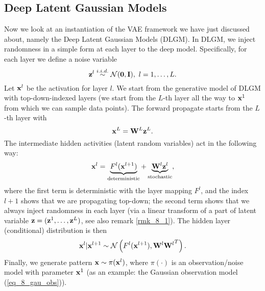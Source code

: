 \documentclass[../book-template.tex]{subfiles}
\begin{document}
\subsection{Deep Latent Gaussian Models}
Now we look at an instantiation of the VAE framework we have just discussed about, namely the Deep Latent Gaussian Models (DLGM). In DLGM, we inject randomness in a simple form at each layer to the deep model.  Specifically, for each layer we define a noise variable
\begin{equation*}
	{\bf z}^l\overset{i.i.d.}{\sim}\mathcal{N}({\bf 0,I}),\ l=1,\dots,L.
\end{equation*}
Let ${\bf x}^l$ be the activation for layer $l$. We start from the generative model of DLGM with top-down-indexed layers (we start from the $L$-th layer all the way to ${\bf x}^1$ from which we can sample data points). The forward propagate starts from the $L$-th layer with
\begin{equation*}
	{\bf x}^L={\bf W}^L{\bf z}^L.
\end{equation*}
The intermediate hidden activities (latent random variables) act in the following way:
\begin{equation*}
	{\bf x}^l=\underbrace{F^l({\bf x}^{l+1})}_{\rm deterministic}+\underbrace{{\bf W}^l{\bf z}^l}_{\rm stochastic},
\end{equation*}
where the first term is deterministic with the layer mapping $F^l$, and the index $l+1$ shows that we are propagating top-down; the second term shows that we always inject randomness in each layer (via a linear transform of a part of latent variable ${\bf z}=({\bf z}^1,\dots,{\bf z}^L)$, see also remark \ref{rmk_8_1}). The hidden layer (conditional) distribution is then
\begin{equation*}
	{\bf x}^l|{\bf x}^{l+1}\sim \mathcal{N}\left(F^l({\bf x}^{l+1}),{{\bf W}^l{\bf W}^l}^T\right).
\end{equation*}
Finally, we generate pattern ${\bf x}\sim \pi({\bf x}^l)$, where $\pi(\cdot)$ is an observation/noise model with parameter ${\bf x}^1$ (as an example: the Gaussian observation model (\ref{eq_8_gau_obs})).
\end{document}
